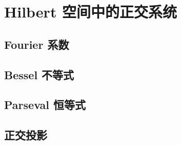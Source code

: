 \section{Hilbert 空间中的正交系统}
\label{b2:sec:0201}


\subsection{Fourier 系数}
\label{b2:subsec:020101}

\subsection{Bessel 不等式}
\label{b2:subsec:020102}

\subsection{Parseval 恒等式}
\label{b2:subsec:020103}

\subsection{正交投影}
\label{b2:subsec:020104}


